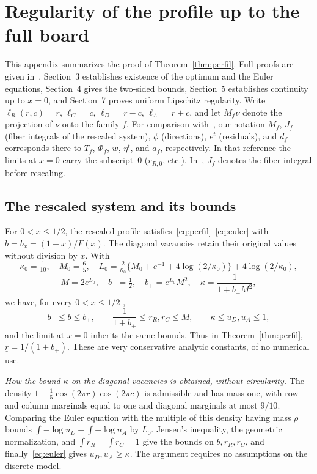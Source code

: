 \section{Regularity of the profile up to the full board}\label{app:perfil}

This appendix summarizes the proof of Theorem~\ref{thm:perfil}. Full proofs are given in~\cite{Perfil}.
Section~3 establishes existence
of the optimum and the Euler equations, Section~4 gives the two-sided bounds, Section~5 establishes
continuity up to $x=0$, and
Section~7 proves uniform Lipschitz regularity. Write $\ell_R(r,c)=r$, $\ell_C=c$, $\ell_D=r-c$,
$\ell_A=r+c$, and let $M_f\nu$ denote
the projection of $\nu$ onto the family $f$. For comparison with~\cite{Perfil}, our notation $M_f$, $J_f$
(fiber integrals of the
rescaled system), $\phi$ (directions), $e^t$ (residuals), and $d_f$ corresponds there to $T_f$, $\Phi_f$,
$w$, $\eta^t$, and $a_f$,
respectively. In that reference the limits at $x=0$ carry the subscript~$0$ ($r_{R,0}$, etc.).
In~\cite{Perfil}, $J_f$ denotes the
fiber integral before rescaling.

\subsection{The rescaled system and its bounds}

For $0<x\le1/2$, the rescaled profile satisfies~\eqref{eq:perfil}--\eqref{eq:euler} with $b=b_x=(1-x)/F(x)$.
The diagonal vacancies
retain their original values without division by $x$. With \[
 \kappa_0=\tfrac1{10},\quad M_0=\tfrac65,\quad
 L_0=\tfrac2{\kappa_0}\bigl\{M_0+e^{-1}+4\log(2/\kappa_0)\bigr\}+4\log(2/\kappa_0),
\] \[
 M=2e^{L_0},\quad b_-=\tfrac12,\quad b_+=e^{L_0}M^2,\quad \kappa=\frac1{1+b_+M^2},
\] we have, for every $0<x\le1/2$ \cite[Proposition~4.2]{Perfil}, \begin{equation}\label{eq:cotas_perfil}
 b_-\le b\le b_+,\qquad \frac1{1+b_+}\le r_R,r_C\le M,\qquad \kappa\le u_D,u_A\le1,
\end{equation} and the limit at $x=0$ inherits the same bounds. Thus in Theorem~\ref{thm:perfil},
$\underline r=1/(1+b_+)$. These
are very conservative analytic constants, of no numerical use.

\emph{How the bound $\kappa$ on the diagonal vacancies is obtained, without circularity.} The density
$1-\frac15\cos(2\pi r)\cos(2\pi c)$ is admissible and has mass one,
with row and column marginals equal to one and diagonal marginals at most $9/10$. Comparing the Euler
equation with the multiple of
this density having mass $\rho$ bounds $\int-\log u_D+\int-\log u_A$ by $L_0$. Jensen's inequality, the
geometric normalization, and
$\int r_R=\int r_C=1$ give the bounds on $b,r_R,r_C$, and finally~\eqref{eq:euler} gives $u_D,u_A\ge\kappa$.
The argument requires no
assumptions on the discrete model.


